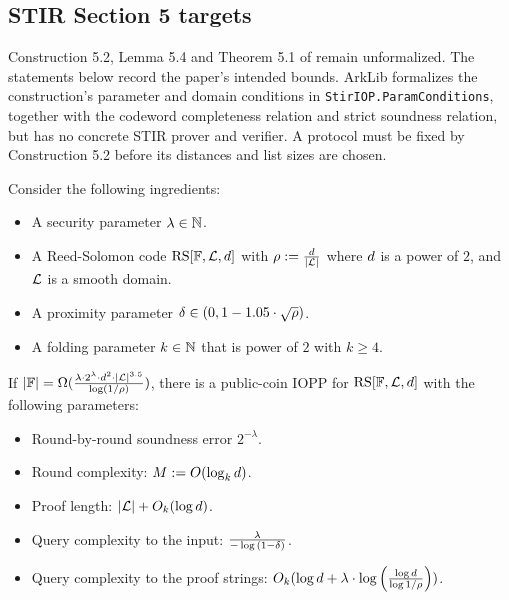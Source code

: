 \subsection{STIR Section 5 targets}

Construction 5.2, Lemma 5.4 and Theorem 5.1 of \cite{ACFY24stir} remain unformalized.
The statements below record the paper's intended bounds. ArkLib formalizes the construction's
parameter and domain conditions in \texttt{StirIOP.ParamConditions}, together with the codeword
completeness relation and strict soundness relation, but has no concrete STIR prover and verifier.
A protocol must be fixed by Construction 5.2 before its distances and list sizes are chosen.

\begin{theorem}\label{thm:stir}
    Consider the following ingredients:
    \begin{itemize}
        \item A security parameter $\lambda\in\mathbb{N}$.
        \item A Reed-Solomon code $\mathrm{RS}[\mathbb{F},\mathcal{L},d]$ with $\rho:=\frac{d}{|\mathcal{L}|}$ where $d$ is a power of $2$, and $\mathcal{L}$ is a smooth domain.
        \item A proximity parameter $\delta\in(0,1-1.05\cdot\sqrt{\rho})$.
        \item A folding parameter $k\in\mathbb{N}$ that is power of $2$ with $k\geq 4$.
    \end{itemize}
If $|\mathbb{F}|=\Omega(\frac{\lambda\cdot2^\lambda\cdot d^2\cdot{|\mathcal{L}|}^{3.5}}{\log(1/\rho)})$, there is a public-coin IOPP for $\mathrm{RS}[\mathbb{F},\mathcal{L},d]$ with the following parameters:
\begin{itemize}
    \item Round-by-round soundness error $2^{-\lambda}$.
    \item Round complexity: $M:=O(\log_k{d})$.
    \item Proof length: $|\mathcal{L}|+O_k(\log{d})$.
    \item Query complexity to the input: $\frac{\lambda}{-\log{(1-\delta)}}$.
    \item Query complexity to the proof strings: $O_k(\log{d}+\lambda\cdot\log{\Big(\frac{\log{d}}{\log{1/\rho}}\Big)})$.
\end{itemize}
\end{theorem}

